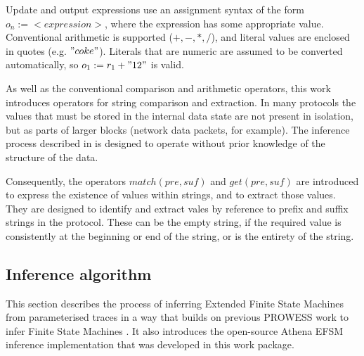 Update and output expressions use an assignment syntax of the form $o_n := <expression>$, where the expression has some appropriate value. Conventional arithmetic is supported ($+,-,*,/$), and literal values are enclosed in quotes (e.g. $"coke"$). Literals that are numeric are assumed to be converted automatically, so $o_1 := r_1 + "12"$ is valid. 

As well as the conventional comparison and arithmetic operators, this work introduces operators for string comparison and extraction. In many protocols the values that must be stored in the internal data state are not present in isolation, but as parts of larger blocks (network data packets, for example). The inference process described in  is designed to operate without prior knowledge of the structure of the data. 

Consequently, the operators $match(pre,suf)$ and $get(pre,suf)$ are introduced to express the existence of values within strings, and to extract those values. They are designed to identify and extract vales by reference to prefix and suffix strings in the protocol. These can be the empty string, if the required value is consistently at the beginning or end of the string, or is the entirety of the string. 




\subsection{Inference algorithm}
\label{Algorithm}

This section describes the process of inferring Extended Finite State Machines from parameterised traces in a way that builds on previous PROWESS work to infer Finite State Machines \cite{}. It also introduces the open-source Athena \cite{Athena} EFSM inference implementation that was developed in this work package.

